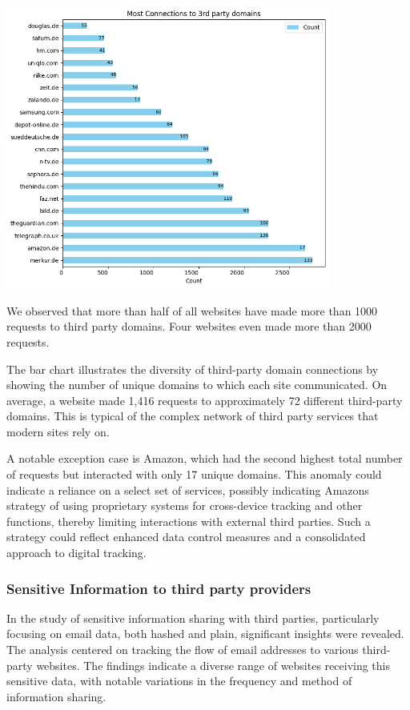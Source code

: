 \vspace{0.5cm}
\includegraphics[width=0.8\textwidth]{./assets/mostConnectionsToThirdPartyDomains.png}
\vspace{0.5cm}

We observed that more than half of all websites have made more than 1000 requests to third party domains. Four websites even made more than 2000 requests. 

The bar chart illustrates the diversity of third-party domain connections by showing the number of unique domains to which each site communicated. On average, a website made 1,416 requests to approximately 72 different third-party domains. This is typical of the complex network of third party services that modern sites rely on.

A notable exception case is Amazon, which had the second highest total number of requests but interacted with only 17 unique domains. This anomaly could indicate a reliance on a select set of services, possibly indicating Amazons strategy of using proprietary systems for cross-device tracking and other functions, thereby limiting interactions with external third parties. Such a strategy could reflect enhanced data control measures and a consolidated approach to digital tracking.

\subsubsection{Sensitive Information to third party providers}
In the study of sensitive information sharing with third parties, particularly focusing on email data, both hashed and plain, significant insights were revealed. The analysis centered on tracking the flow of email addresses to various third-party websites. The findings indicate a diverse range of websites receiving this sensitive data, with notable variations in the frequency and method of information sharing.


